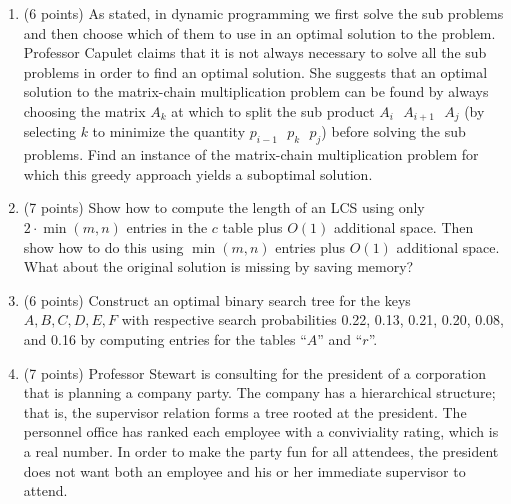 \documentclass[12pt]{report}
\begin{document}
\maketitle

\begin{enumerate}[label=\arabic*.]
	\item (6 points) As stated, in dynamic programming we first solve the sub problems and then choose which of them to use in an optimal solution to the problem. Professor Capulet claims that it is not always necessary to solve all the sub problems in order to find an optimal solution. She suggests that an optimal solution to the matrix-chain multiplication problem can be found by always choosing the matrix $A_{k}$ at which to split the sub product $A_{i}\mbox{ } A_{i+1}\mbox{ } A_{j}$ (by selecting $k$ to minimize the quantity $p_{i-1}\mbox{ } p_{k}\mbox{ }  p_{j}$) before solving the sub problems. Find an instance of the matrix-chain multiplication problem for which this greedy approach yields a suboptimal solution.
	\item (7 points) Show how to compute the length of an LCS using only $2\cdotp\min(m, n)$ entries in the $c$ table plus $O(1)$ additional space. Then show how to do this using $\min(m, n)$ entries plus $O(1)$ additional space. What about the original solution is missing by saving memory?
	\item (6 points) Construct an optimal binary search tree for the keys $A, B, C, D, E, F$ with respective search probabilities 0.22, 0.13, 0.21, 0.20, 0.08, and 0.16 by computing entries for the tables ``$A$'' and ``$r$''.
	\item (7 points) Professor Stewart is consulting for the president of a corporation that is planning a company party. The company has a hierarchical structure; that is, the supervisor relation forms a tree rooted at the president. The personnel office has ranked each employee with a conviviality rating, which is a real number. In order to make the party fun for all attendees, the president does not want both an employee and his or her immediate supervisor to attend.\\


\end{enumerate}
\end{document}

